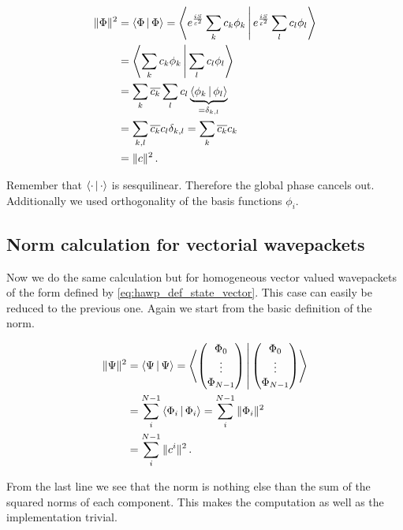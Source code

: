 \begin{equation}
\begin{split}
  \|\Phi\|^2 & = \Braket{\Phi|\Phi}
              = \Braket{e^{\frac{iS}{\varepsilon^2}} \sum_k c_k \phi_k | e^{\frac{iS}{\varepsilon^2}} \sum_l c_l \phi_l} \\
             & = \Braket{\sum_k c_k \phi_k | \sum_l c_l \phi_l} \\
             & = \sum_k \overline{c_k} \sum_l c_l  \underbrace{\Braket{\phi_k | \phi_l}}_{= \delta_{k,l}} \\
             & = \sum_{k,l} \overline{c_k} c_l \delta_{k,l} = \sum_k \overline{c_k} c_k \\
             & = \| c \|^2 \,.
\end{split}
\end{equation}

Remember that $\Braket{\cdot|\cdot}$ is sesquilinear. Therefore the global phase
cancels out. Additionally we used orthogonality of the basis functions $\phi_i$.

\subsection{Norm calculation for vectorial wavepackets}

Now we do the same calculation but for homogeneous vector valued wavepackets of
the form defined by \eqref{eq:hawp_def_state_vector}. This case can easily be reduced
to the previous one. Again we start from the basic definition of the norm.

\begin{equation}
\begin{split}
  \| \Psi \|^2 & = \Braket{\Psi|\Psi}
                = \Braket{\begin{pmatrix} \Phi_0 \\ \vdots \\ \Phi_{N-1} \end{pmatrix} | \begin{pmatrix} \Phi_0 \\ \vdots \\ \Phi_{N-1} \end{pmatrix}} \\
               & = \sum_i^{N-1} \Braket{\Phi_i | \Phi_i} = \sum_i^{N-1} \| \Phi_i \|^2 \\
               & = \sum_i^{N-1} \| c^i \|^2 \,.
\end{split}
\end{equation}

From the last line we see that the norm is nothing else than the sum of the squared
norms of each component. This makes the computation as well as the implementation
trivial.

